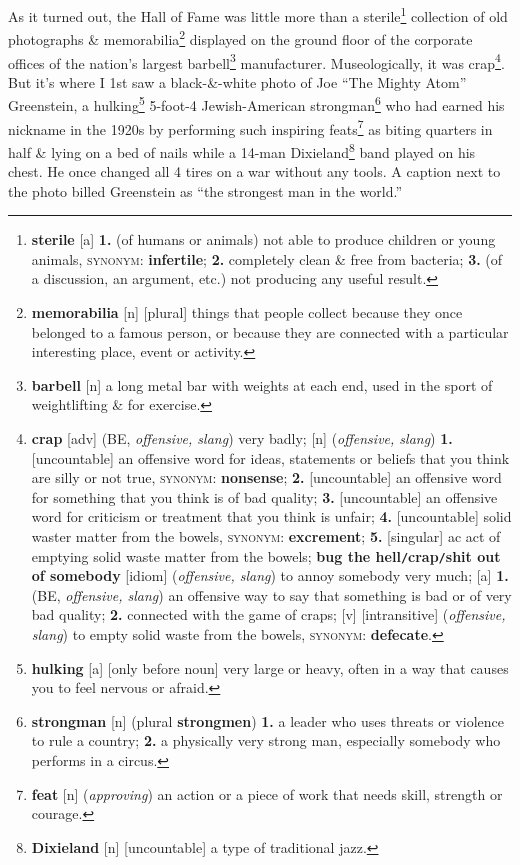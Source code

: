 \documentclass[oneside]{book}
\numberwithin{equation}{section}
\begin{document}
As it turned out, the Hall of Fame was little more than a sterile\footnote{\textbf{sterile} [a] \textbf{1.} (of humans or animals) not able to produce children or young animals, \textsc{synonym}: \textbf{infertile}; \textbf{2.} completely clean \& free from bacteria; \textbf{3.} (of a discussion, an argument, etc.) not producing any useful result.} collection of old photographs \& memorabilia\footnote{\textbf{memorabilia} [n] [plural] things that people collect because they once belonged to a famous person, or because they are connected with a particular interesting place, event or activity.} displayed on the ground floor of the corporate offices of the nation's largest barbell\footnote{\textbf{barbell} [n] a long metal bar with weights at each end, used in the sport of weightlifting \& for exercise.} manufacturer. Museologically, it was crap\footnote{\textbf{crap} [adv] (BE, \textit{offensive, slang}) very badly; [n] (\textit{offensive, slang}) \textbf{1.} [uncountable] an offensive word for ideas, statements or beliefs that you think are silly or not true, \textsc{synonym}: \textbf{nonsense}; \textbf{2.} [uncountable] an offensive word for something that you think is of bad quality; \textbf{3.} [uncountable] an offensive word for criticism or treatment that you think is unfair; \textbf{4.} [uncountable] solid waster matter from the bowels, \textsc{synonym}: \textbf{excrement}; \textbf{5.} [singular] ac act of emptying solid waste matter from the bowels; \textbf{bug the hell\texttt{/}crap\texttt{/}shit out of somebody} [idiom] (\textit{offensive, slang}) to annoy somebody very much; [a] \textbf{1.} (BE, \textit{offensive, slang}) an offensive way to say that something is bad or of very bad quality; \textbf{2.} connected with the game of craps; [v] [intransitive] (\textit{offensive, slang}) to empty solid waste from the bowels, \textsc{synonym}: \textbf{defecate}.}. But it's where I 1st saw a black-\&-white photo of Joe ``The Mighty Atom'' Greenstein, a hulking\footnote{\textbf{hulking} [a] [only before noun] very large or heavy, often in a way that causes you to feel nervous or afraid.} 5-foot-4 Jewish-American strongman\footnote{\textbf{strongman} [n] (plural \textbf{strongmen}) \textbf{1.} a leader who uses threats or violence to rule a country; \textbf{2.} a physically very strong man, especially somebody who performs in a circus.} who had earned his nickname in the 1920s by performing such inspiring feats\footnote{\textbf{feat} [n] (\textit{approving}) an action or a piece of work that needs skill, strength or courage.} as biting quarters in half \& lying on a bed of nails while a 14-man Dixieland\footnote{\textbf{Dixieland} [n] [uncountable] a type of traditional jazz.} band played on his chest. He once changed all 4 tires on a war without any tools. A caption next to the photo billed Greenstein as ``the strongest man in the world.''
\end{document}
